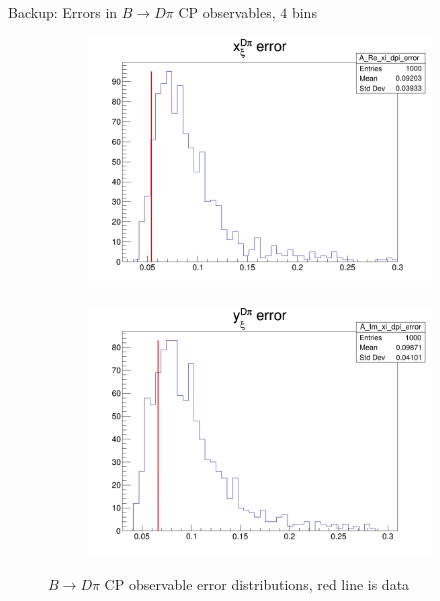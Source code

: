 \documentclass{beamer}
\begin{document}
\begin{frame}{Backup: Errors in $B\to D\pi$ CP observables, $4$ bins}
  \begin{figure}
    \centering
    \vspace{-0.2cm}
    \begin{subfigure}{0.5\textwidth}
      \includegraphics[width = 1.0\textwidth]{A_Re_xi_dpi_4Bins_error.png}
    \end{subfigure}%
    \begin{subfigure}{0.5\textwidth}
      \includegraphics[width = 1.0\textwidth]{A_Im_xi_dpi_4Bins_error.png}
    \end{subfigure}
    \caption{$B\to D\pi$ CP observable error distributions, red line is data}
  \end{figure}
\end{frame}
\end{document}
